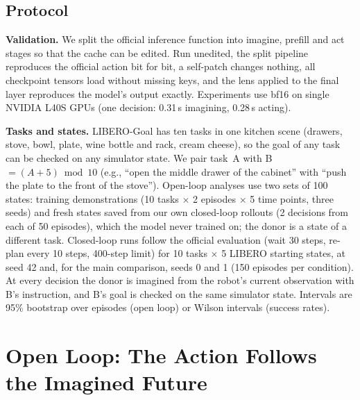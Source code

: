 \documentclass[conference]{IEEEtran}
\begin{document}
\subsection{Protocol}
\textbf{Validation.} We split the official inference function into imagine, prefill and act stages so that the cache can
be edited. Run unedited, the split pipeline reproduces the official action bit for bit, a self-patch changes nothing,
all checkpoint tensors load without missing keys, and the lens applied to the final layer reproduces the model's
output exactly. Experiments use bf16 on single NVIDIA L40S GPUs (one decision: 0.31\,s imagining, 0.28\,s acting).

\textbf{Tasks and states.} LIBERO-Goal has ten tasks in one kitchen scene (drawers, stove, bowl, plate, wine bottle and
rack, cream cheese), so the goal of any task can be checked on any simulator state. We pair task~A with
B $= (A+5) \bmod 10$ (e.g., ``open the middle drawer of the cabinet'' with ``push the plate to the front of the stove''). Open-loop
analyses use two sets of 100 states: training demonstrations (10 tasks $\times$ 2 episodes $\times$ 5 time points,
three seeds) and fresh states saved from our own closed-loop rollouts (2 decisions from each of 50 episodes), which
the model never trained on; the donor is a state of a different task. Closed-loop runs follow the official evaluation (wait
30 steps, re-plan every 10 steps, 400-step limit) for 10 tasks $\times$ 5 LIBERO starting states, at seed 42 and,
for the main comparison, seeds 0 and 1 (150 episodes per condition). At every decision the donor is imagined from the robot's current observation
with B's instruction, and B's goal is checked on the same simulator state. Intervals are 95\% bootstrap over episodes
(open loop) or Wilson intervals (success rates).

\section{Open Loop: The Action Follows the Imagined Future}
\label{sec:open}
\end{document}
